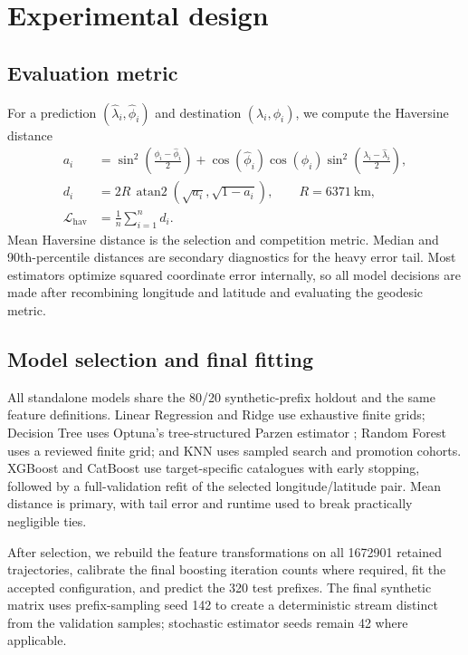 \section{Experimental design}

\subsection{Evaluation metric}

For a prediction $(\hat\lambda_i,\hat\phi_i)$ and destination $(\lambda_i,\phi_i)$, we compute the Haversine distance
\begin{align}
  a_i &= \sin^2\!\left(\frac{\phi_i-\hat\phi_i}{2}\right)
  +\cos(\hat\phi_i)\cos(\phi_i)
   \sin^2\!\left(\frac{\lambda_i-\hat\lambda_i}{2}\right),\\
  d_i &= 2R\,\operatorname{atan2}\!\left(\sqrt{a_i},\sqrt{1-a_i}\right),
  \qquad R=6371\ \mathrm{km},\\
  \mathcal L_{\mathrm{hav}}&=\frac{1}{n}\sum_{i=1}^{n}d_i.
\end{align}
Mean Haversine distance is the selection and competition metric.  Median and 90th-percentile distances are secondary diagnostics for the heavy error tail.  Most estimators optimize squared coordinate error internally, so all model decisions are made after recombining longitude and latitude and evaluating the geodesic metric.

\subsection{Model selection and final fitting}

All standalone models share the 80/20 synthetic-prefix holdout and the same feature definitions.  Linear Regression and Ridge use exhaustive finite grids; Decision Tree uses Optuna's tree-structured Parzen estimator \citep{akiba2019optuna}; Random Forest uses a reviewed finite grid; and KNN uses sampled search and promotion cohorts.  XGBoost and CatBoost use target-specific catalogues with early stopping, followed by a full-validation refit of the selected longitude/latitude pair.  Mean distance is primary, with tail error and runtime used to break practically negligible ties.

After selection, we rebuild the feature transformations on all \num{1672901} retained trajectories, calibrate the final boosting iteration counts where required, fit the accepted configuration, and predict the 320 test prefixes.  The final synthetic matrix uses prefix-sampling seed 142 to create a deterministic stream distinct from the validation samples; stochastic estimator seeds remain 42 where applicable.

